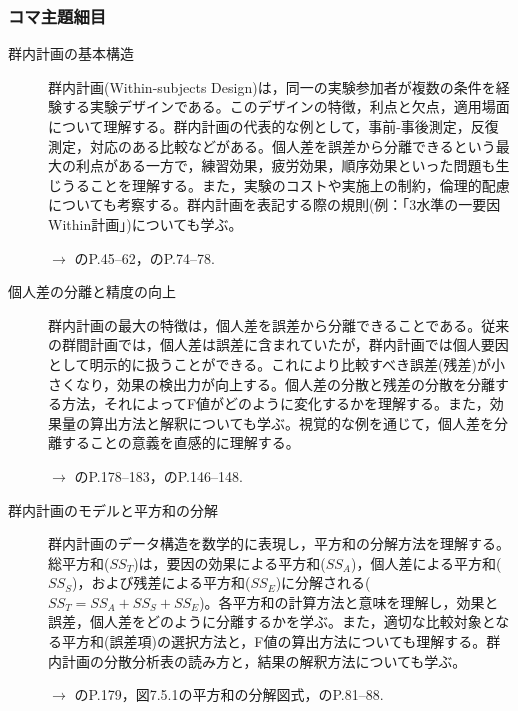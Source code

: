 \subsubsection{コマ主題細目}
\begin{description}
	\item[群内計画の基本構造] 群内計画(Within-subjects Design)は，同一の実験参加者が複数の条件を経験する実験デザインである。このデザインの特徴，利点と欠点，適用場面について理解する。群内計画の代表的な例として，事前-事後測定，反復測定，対応のある比較などがある。個人差を誤差から分離できるという最大の利点がある一方で，練習効果，疲労効果，順序効果といった問題も生じうることを理解する。また，実験のコストや実施上の制約，倫理的配慮についても考察する。群内計画を表記する際の規則(例：「3水準の一要因Within計画」)についても学ぶ。
	      \begin{flushright}
		      $\to$ \textcite{Toyoda201706}のP.45--62，\textcite{kosugi2018}のP.74--78.
	      \end{flushright}

	\item[個人差の分離と精度の向上] 群内計画の最大の特徴は，個人差を誤差から分離できることである。従来の群間計画では，個人差は誤差に含まれていたが，群内計画では個人要因として明示的に扱うことができる。これにより比較すべき誤差(残差)が小さくなり，効果の検出力が向上する。個人差の分散と残差の分散を分離する方法，それによってF値がどのように変化するかを理解する。また，効果量の算出方法と解釈についても学ぶ。視覚的な例を通じて，個人差を分離することの意義を直感的に理解する。
	      \begin{flushright}
		      $\to$ \textcite{Yamada2004}のP.178--183，\textcite{kosugi2019}のP.146--148.
	      \end{flushright}

	\item[群内計画のモデルと平方和の分解] 群内計画のデータ構造を数学的に表現し，平方和の分解方法を理解する。総平方和($SS_T$)は，要因の効果による平方和($SS_A$)，個人差による平方和($SS_S$)，および残差による平方和($SS_E$)に分解される($SS_T = SS_A + SS_S + SS_E$)。各平方和の計算方法と意味を理解し，効果と誤差，個人差をどのように分離するかを学ぶ。また，適切な比較対象となる平方和(誤差項)の選択方法と，F値の算出方法についても理解する。群内計画の分散分析表の読み方と，結果の解釈方法についても学ぶ。
	      \begin{flushright}
		      $\to$ \textcite{Yamada2004}のP.179，図7.5.1の平方和の分解図式，\textcite{kosugi2018}のP.81--88.
	      \end{flushright}


\end{description}
